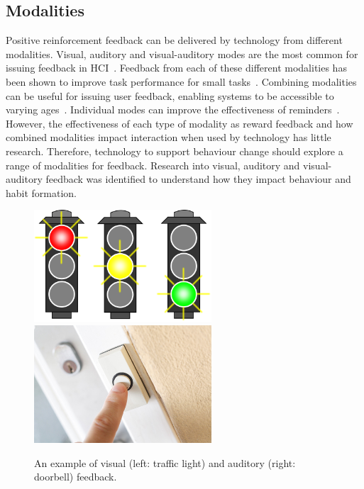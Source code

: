 
\subsection{Modalities}
Positive reinforcement feedback can be delivered by technology from different modalities. Visual, auditory and visual-auditory modes are the most common for issuing feedback in HCI~\cite{desinging_interface_speech_tech}. Feedback from each of these different modalities has been shown to improve task performance for small tasks~\cite{chi_oussama_tap_the_shapetones}. Combining modalities can be useful for issuing user feedback, enabling systems to be accessible to varying ages~\cite{article_user_centred_multimodal_reminders}. Individual modes can improve the effectiveness of reminders~\cite{multi_modal_reminders_less_disruptive, article_designing_multimodal_reminders_for_home}. However, the effectiveness of each type of modality as reward feedback and how combined modalities impact interaction when used by technology has little research. Therefore, technology to support behaviour change should explore a range of modalities for feedback. Research into visual, auditory and visual-auditory feedback was identified to understand how they impact behaviour and habit formation.

\begin{figure}[H]
  \centering
  \includegraphics[width=2.6in]{../resources/visual.png}
  \hspace{10px}
  \includegraphics[width=2.6in]{../resources/audio.png}
  \caption{An example of visual (left: traffic light) and auditory (right: doorbell) feedback.}
  \label{fig:visual_audio}
\end{figure}

